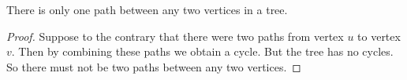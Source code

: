 \begin{prop}

There is only one path between any two vertices in a tree.

\begin{proof}

Suppose to the contrary that there were two paths from vertex $u$ to vertex $v$.
Then by combining these paths we obtain a cycle.
But the tree has no cycles.
So there must not be two paths between any two vertices.
\end{proof}

\end{prop}
